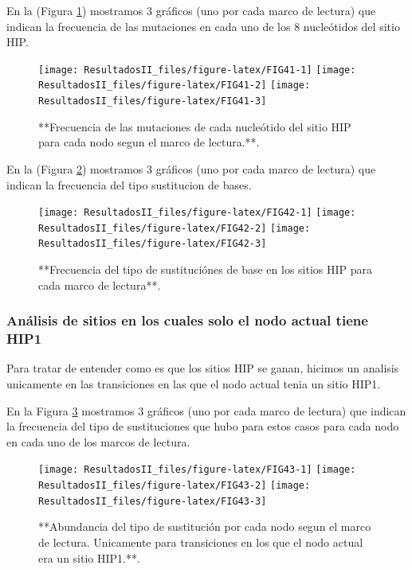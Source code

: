 \documentclass[
]{book}
\begin{document}
En la (Figura \ref{fig:FIG41}) mostramos 3 gráficos (uno por cada marco de lectura) que indican la frecuencia de las mutaciones en cada uno de los 8 nucleótidos del sitio HIP.

\begin{figure}

{\centering \texttt{[image: ResultadosII\_files/figure-latex/FIG41-1]} \texttt{[image: ResultadosII\_files/figure-latex/FIG41-2]} \texttt{[image: ResultadosII\_files/figure-latex/FIG41-3]} 

}

\caption{**Frecuencia de las mutaciones de cada nucleótido del sitio HIP para cada nodo segun el marco de lectura.**.}\label{fig:FIG41}
\end{figure}

En la (Figura \ref{fig:FIG42}) mostramos 3 gráficos (uno por cada marco de lectura) que indican la frecuencia del tipo sustitucion de bases.

\begin{figure}

{\centering \texttt{[image: ResultadosII\_files/figure-latex/FIG42-1]} \texttt{[image: ResultadosII\_files/figure-latex/FIG42-2]} \texttt{[image: ResultadosII\_files/figure-latex/FIG42-3]} 

}

\caption{**Frecuencia del tipo de sustituciónes de base en los sitios HIP para cada marco de lectura**.}\label{fig:FIG42}
\end{figure}

\hypertarget{anuxe1lisis-de-sitios-en-los-cuales-solo-el-nodo-actual-tiene-hip1-3}{%
\subsubsection{Análisis de sitios en los cuales solo el nodo actual tiene HIP1}\label{anuxe1lisis-de-sitios-en-los-cuales-solo-el-nodo-actual-tiene-hip1-3}}

Para tratar de entender como es que los sitios HIP se ganan, hicimos un analisis unicamente en las transiciones en las que el nodo actual tenia un sitio HIP1.

En la Figura \ref{fig:FIG43} mostramos 3 gráficos (uno por cada marco de lectura) que indican la frecuencia del tipo de sustituciones que hubo para estos casos para cada nodo en cada uno de los marcos de lectura.

\begin{figure}

{\centering \texttt{[image: ResultadosII\_files/figure-latex/FIG43-1]} \texttt{[image: ResultadosII\_files/figure-latex/FIG43-2]} \texttt{[image: ResultadosII\_files/figure-latex/FIG43-3]} 

}

\caption{**Abundancia del tipo de sustitución por cada nodo segun el marco de lectura. Unicamente para transiciones en los que el nodo actual era un sitio HIP1.**.}\label{fig:FIG43}
\end{figure}
\end{document}
